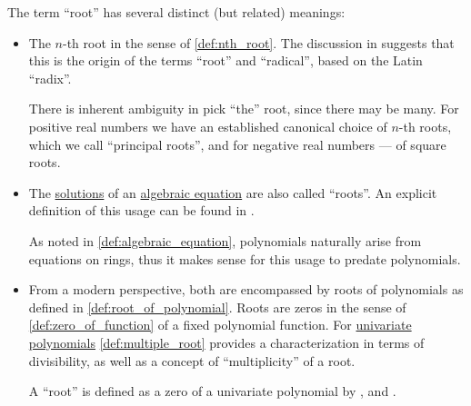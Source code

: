 \begin{remark}\label{rem:root_terminology}
  The term \enquote{root} has several distinct (but related) meanings:
  \begin{itemize}
    \item The \( n \)-th root in the sense of \cref{def:nth_root}. The discussion in \cite{HSMSE:radical_symbol_history} suggests that this is the origin of the terms \enquote{root} and \enquote{radical}, based on the Latin \enquote{radix}.

    There is inherent ambiguity in pick \enquote{the} root, since there may be many. For positive real numbers we have an established canonical choice of \( n \)-th roots, which we call \enquote{principal roots}, and for negative real numbers --- of square roots.

    \item The \hyperref[def:equation/solution]{solutions} of an \hyperref[def:algebraic_equation]{algebraic equation} are also called \enquote{roots}. An explicit definition of this usage can be found in .

    As noted in \cref{def:algebraic_equation}, polynomials naturally arise from equations on rings, thus it makes sense for this usage to predate polynomials.

    \item From a modern perspective, both are encompassed by roots of polynomials as defined in \cref{def:root_of_polynomial}. Roots are zeros in the sense of \cref{def:zero_of_function} of a fixed polynomial function. For \hyperref[def:univariate_polynomial]{univariate polynomials} \cref{def:multiple_root} provides a characterization in terms of divisibility, as well as a concept of \enquote{multiplicity} of a root.

    A \enquote{root} is defined as a zero of a univariate polynomial by
    ,
     and
    .
  \end{itemize}
\end{remark}

